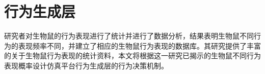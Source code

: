 \section{行为生成层}

研究者对生物鼠的行为表现进行了统计并进行了数据分析，结果表明生物鼠不同行为的表现频率不同，并建立了相应的生物鼠行为表现的数据库\cite{ISI:000436213800018}。其研究提供了丰富的关于生物鼠行为表现的统计资料，本文将根据这一研究已揭示的生物鼠不同行为表现概率设计仿真平台行为生成层的行为决策机制。



